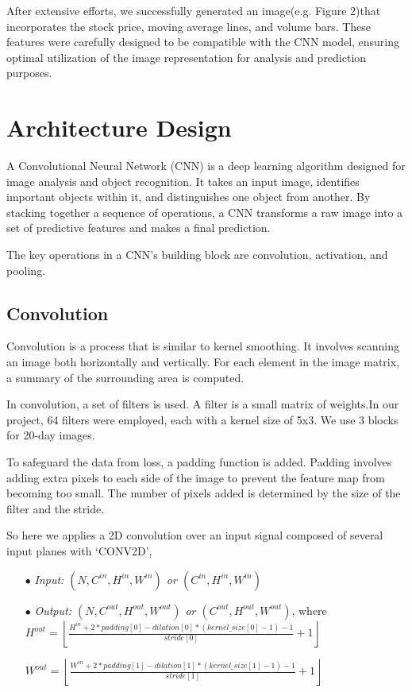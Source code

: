 \documentclass{article}
\begin{document}
After extensive efforts, we successfully generated an image(e.g. Figure 2)that incorporates the stock price, moving average lines, and volume bars. These features were carefully designed to be compatible with the CNN model, ensuring optimal utilization of the image representation for analysis and prediction purposes.

\section{Architecture Design}
A Convolutional Neural Network (CNN) is a deep learning algorithm designed for image analysis and object recognition. It takes an input image, identifies important objects within it, and distinguishes one object from another. By stacking together a sequence of operations, a CNN transforms a raw image into a set of predictive features and makes a final prediction.  

The key operations in a CNN's building block are convolution, activation, and pooling.

\subsection{Convolution}
Convolution is a process that is similar to kernel smoothing. It involves scanning an image both horizontally and vertically. For each element in the image matrix, a summary of the surrounding area is computed.

In convolution, a set of filters is used. A filter is a small matrix of weights.In our project, 64 filters were employed, each with a kernel size of 5x3. We use 3 blocks for 20-day images. 

To safeguard the data from loss, a padding function is added. Padding involves adding extra pixels to each side of the image to prevent the feature map from becoming too small. The number of pixels added is determined by the size of the filter and the stride. 

So here we applies a 2D convolution over an input signal composed of several input planes with ‘CONV2D’,
\begin{itemize}
    \setlength\itemindent{2em}
    \item[$\bullet$] \emph{Input: $(N, C^{in}, H^{in}, W^{in})$ or $(C^{in}, H^{in}, W^{in})$}

    \item[$\bullet$] \emph{Output: $(N,C^{out}, H^{out}, W^{out})$ or $(C^{out}, H^{out}, W^{out})$}, where \\
    
    \emph{$H^{out} = \left\lfloor\frac{H^{in} + 2 * padding[0] - dilation[0] * (kernel\_size[0]-1)-1}{stride[0]} + 1 \right\rfloor$}
    
    \emph{$W^{out} = \left\lfloor\frac{W^{in} + 2 * padding[1] - dilation[1] * (kernel\_size[1]-1)-1}{stride[1]} + 1\right\rfloor$}
    
\end{itemize}
\end{document}
